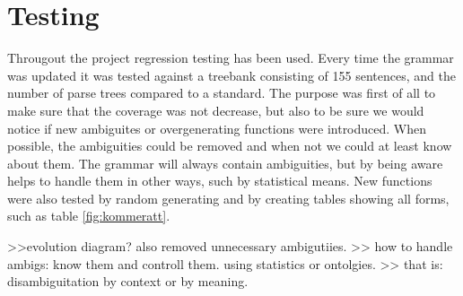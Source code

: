 \documentclass{report}
\begin{document}
\section{Testing}
Througout the project regression testing has been used. Every time the grammar was updated
it was tested against a treebank consisting of 155 sentences, and the number of parse trees
compared to a standard.
The purpose was first of all to
make sure that the coverage was not decrease, but also to be sure we would notice
if new ambiguites or overgenerating functions were introduced.
When possible, the ambiguities could be removed and when not we could at least know about
them. The grammar will always contain ambiguities, but by being aware helps to
handle them in other ways, such by statistical means.
New functions were also tested by random generating and by creating tables showing
all forms, such as table \ref{fig:kommeratt}.

>>evolution diagram? also removed unnecessary ambigutiies.
>> how to handle ambigs: know them and controll them. using statistics or ontolgies.
>> that is: disambiguitation by context or by meaning.


\end{document}
